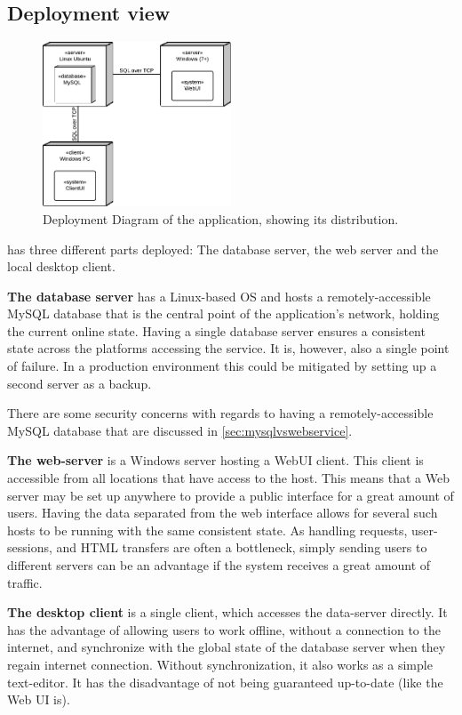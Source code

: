 \subsection{Deployment view}
\label{sec:deployment}

\begin{figure}[htb]
	\centering
	\includegraphics[width=0.5\textwidth]{Software_architecture/graphics/deployment-diag.png}
	\caption{Deployment Diagram of the application, showing its distribution.}
	\label{fig:deployment-diag}
\end{figure}

\SOP{} has three different parts deployed: The database server, the web server and the local
desktop client.

{\bf The database server} has a Linux-based OS and hosts a remotely-accessible MySQL database
that is the central point of the application's network, holding the current online state. Having
a single database server ensures a consistent state across the platforms accessing the service.
It is, however, also a single point of failure. In a production environment this could be mitigated
by setting up a second server as a backup.

There are some security concerns with regards to having a remotely-accessible MySQL database that are
discussed in \ref{sec:mysqlvswebservice}.

{\bf The web-server} is a Windows server hosting a WebUI client. This client is accessible from all
locations that have access to the host. This means that a Web server may be set up anywhere to provide
a public interface for a great amount of users. Having the data separated from the web interface allows
for several such hosts to be running with the same consistent state. As handling requests, user-sessions,
and HTML transfers are often a bottleneck, simply sending users to different servers can be an advantage if the system receives a great
amount of traffic.

{\bf The desktop client} is a single client, which accesses the data-server directly. It has the advantage
of allowing users to work offline, without a connection to the internet, and synchronize with the global
state of the database server when they regain internet connection. Without synchronization, it also works
as a simple text-editor. It has the disadvantage of not being guaranteed up-to-date (like the Web UI is).